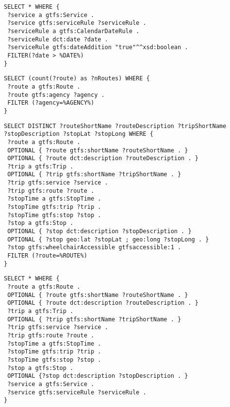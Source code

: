 \begin{lstlisting}[caption=Query 5 - Services that have been added on a specific day, label=lst:sparql5, basicstyle=\small,frame=single]
SELECT * WHERE {
 ?service a gtfs:Service .
 ?service gtfs:serviceRule ?serviceRule .
 ?serviceRule a gtfs:CalendarDateRule .
 ?serviceRule dct:date ?date .
 ?serviceRule gtfs:dateAddition "true"^^xsd:boolean .
 FILTER(?date > %DATE%)
}
\end{lstlisting}

\begin{lstlisting}[caption=Query 6 - Check the number of routes of a particular agency, label=lst:sparql6, basicstyle=\small,frame=single]
SELECT (count(?route) as ?nRoutes) WHERE {
 ?route a gtfs:Route .
 ?route gtfs:agency ?agency .
 FILTER (?agency=%AGENCY%)
}
\end{lstlisting}


\begin{lstlisting}[caption={Query 7 - List all wheelchair accessible stops along a particular route, with some of their additional data}, label=lst:sparql7, basicstyle=\small,frame=single]
SELECT DISTINCT ?routeShortName ?routeDescription ?tripShortName
?stopDescription ?stopLat ?stopLong WHERE {
 ?route a gtfs:Route .
 OPTIONAL { ?route gtfs:shortName ?routeShortName . }
 OPTIONAL { ?route dct:description ?routeDescription . }
 ?trip a gtfs:Trip .
 OPTIONAL { ?trip gtfs:shortName ?tripShortName . }
 ?trip gtfs:service ?service .
 ?trip gtfs:route ?route .
 ?stopTime a gtfs:StopTime . 
 ?stopTime gtfs:trip ?trip . 
 ?stopTime gtfs:stop ?stop . 
 ?stop a gtfs:Stop . 
 OPTIONAL { ?stop dct:description ?stopDescription . }
 OPTIONAL { ?stop geo:lat ?stopLat ; geo:long ?stopLong . }
 ?stop gtfs:wheelchairAccessible gtfsaccessible:1 .
 FILTER (?route=%ROUTE%)
}
\end{lstlisting}

\begin{lstlisting}[caption={Query 8 - List the routes and their related trips, services, stops and stop times with some of their additional data, if available}, label=lst:sparql8, basicstyle=\small,frame=single]
SELECT * WHERE {
 ?route a gtfs:Route .
 OPTIONAL { ?route gtfs:shortName ?routeShortName . }
 OPTIONAL { ?route dct:description ?routeDescription . }
 ?trip a gtfs:Trip .
 OPTIONAL { ?trip gtfs:shortName ?tripShortName . }
 ?trip gtfs:service ?service .
 ?trip gtfs:route ?route .
 ?stopTime a gtfs:StopTime . 
 ?stopTime gtfs:trip ?trip . 
 ?stopTime gtfs:stop ?stop . 
 ?stop a gtfs:Stop . 
 OPTIONAL {?stop dct:description ?stopDescription . }
 ?service a gtfs:Service .
 ?service gtfs:serviceRule ?serviceRule .
}
\end{lstlisting}

